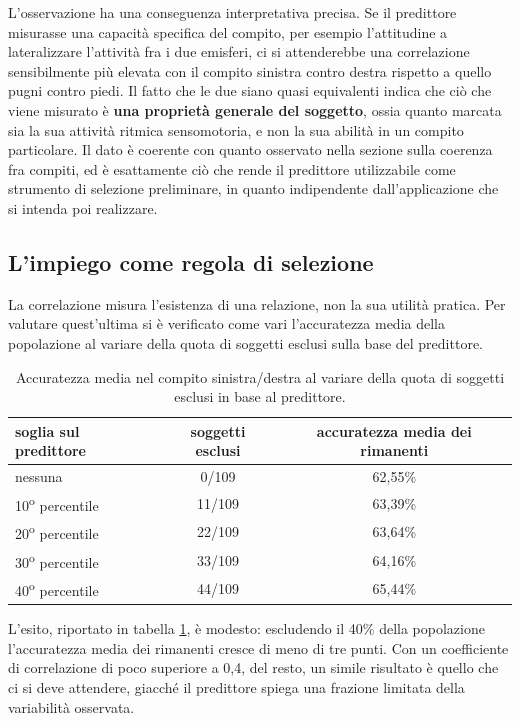 L’osservazione ha una conseguenza interpretativa precisa. Se il predittore misurasse una capacità specifica del compito, per esempio l’attitudine a lateralizzare l’attività fra i due emisferi, ci si attenderebbe una correlazione sensibilmente più elevata con il compito sinistra contro destra rispetto a quello pugni contro piedi. Il fatto che le due siano quasi equivalenti indica che ciò che viene misurato è \textbf{una proprietà generale del soggetto}, ossia quanto marcata sia la sua attività ritmica sensomotoria, e non la sua abilità in un compito particolare. Il dato è coerente con quanto osservato nella sezione sulla coerenza fra compiti, ed è esattamente ciò che rende il predittore utilizzabile come strumento di selezione preliminare, in quanto indipendente dall’applicazione che si intenda poi realizzare.


\subsection{L’impiego come regola di selezione}
La correlazione misura l’esistenza di una relazione, non la sua utilità pratica. Per valutare quest’ultima si è verificato come vari l’accuratezza media della popolazione al variare della quota di soggetti esclusi sulla base del predittore.

\begin{table}[htbp]
\centering
\begin{tabular}{lcc}
\toprule
soglia sul predittore & soggetti esclusi & accuratezza media dei rimanenti \\
\midrule
nessuna              & 0/109  & 62,55\% \\
10\textsuperscript{o} percentile & 11/109 & 63,39\% \\
20\textsuperscript{o} percentile & 22/109 & 63,64\% \\
30\textsuperscript{o} percentile & 33/109 & 64,16\% \\
40\textsuperscript{o} percentile & 44/109 & 65,44\% \\
\bottomrule
\end{tabular}
\caption{Accuratezza media nel compito sinistra/destra al variare della quota di soggetti esclusi in base al predittore.}
\label{tab:screening}
\end{table}

L’esito, riportato in tabella \ref{tab:screening}, è modesto: escludendo il 40\% della popolazione l’accuratezza media dei rimanenti cresce di meno di tre punti. Con un coefficiente di correlazione di poco superiore a 0,4, del resto, un simile risultato è quello che ci si deve attendere, giacché il predittore spiega una frazione limitata della variabilità osservata.

